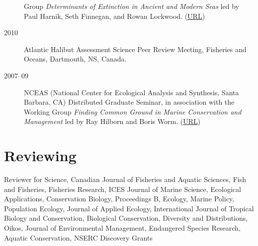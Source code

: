 \begin{description}
Group \emph{Determinants of Extinction in Ancient and Modern Seas} led
by Paul Harnik, Seth Finnegan, and Rowan Lockwood.
(\href{http://www.nescent.org/science/awards_summary.php?id=256}{URL})
\item[2010]
Atlantic Halibut Assessment Science Peer Review Meeting, Fisheries and
Oceans, Dartmouth, NS, Canada.
\item[2007--09]
NCEAS (National Center for Ecological Analysis and Synthesis, Santa
Barbara, CA) Distributed Graduate Seminar, in association with the
Working Group \emph{Finding Common Ground in Marine Conservation and
Management} led by Ray Hilborn and Boris Worm.
(\href{http://www.nceas.ucsb.edu/projects/12307}{URL})
\end{description}

\hypertarget{reviewing}{%
\section{Reviewing}\label{reviewing}}

Reviewer for Science, Canadian Journal of Fisheries and Aquatic
Sciences, Fish and Fisheries, Fisheries Research, ICES Journal of Marine
Science, Ecological Applications, Conservation Biology, Proceedings B,
Ecology, Marine Policy, Population Ecology, Journal of Applied Ecology,
International Journal of Tropical Biology and Conservation, Biological
Conservation, Diversity and Distributions, Oikos, Journal of
Environmental Management, Endangered Species Research, Aquatic
Conservation, NSERC Discovery Grants
